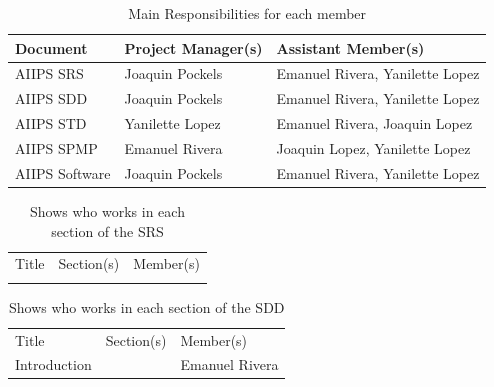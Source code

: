 \documentclass[12pt]{article}
\begin{document}
\begin{table}[H]\centering
\begin{tabular}{|>{\centering\arraybackslash}m{5cm}|>{\centering\arraybackslash}m{5cm}|>{\centering\arraybackslash}m{5cm}|}
  \hline
  Document & Project Manager(s) & Assistant Member(s) \\
   \hline
   AIIPS SRS & Joaquin Pockels & Emanuel Rivera, Yanilette Lopez \\
   \hline
   AIIPS SDD & Joaquin Pockels & Emanuel Rivera, Yanilette Lopez\\
   \hline
   AIIPS STD & Yanilette Lopez & Emanuel Rivera, Joaquin Lopez  \\
   \hline
   AIIPS SPMP & Emanuel Rivera & Joaquin Lopez, Yanilette Lopez \\
   \hline
   AIIPS Software & Joaquin Pockels & Emanuel Rivera, Yanilette Lopez \\
   \hline
\end{tabular}
\caption{Main Responsibilities for each member}
\label{RespMem}
\end{table}

\begin{table}[H]\centering
\begin{tabular}{|>{\centering\arraybackslash}m{5cm}|>{\centering\arraybackslash}m{5cm}|>{\centering\arraybackslash}m{5cm}|}
  \hline
  \multicolumn{3}{|c|}{SRS} \\
  \hline
  Title & Section(s) & Member(s) \\
   \hline
    &  &  \\
   \hline
\end{tabular}
\caption{Shows who works in each section of the SRS}
\label{RespSRS}
\end{table}

\begin{table}[H]\centering
\begin{tabular}{|>{\centering\arraybackslash}m{5cm}|>{\centering\arraybackslash}m{5cm}|>{\centering\arraybackslash}m{5cm}|}
  \hline
  \multicolumn{3}{|c|}{SDD} \\
  \hline
  Title & Section(s) & Member(s) \\
   \hline
    Introduction & 1 & Emanuel Rivera \\
   \hline
\end{tabular}
\caption{Shows who works in each section of the SDD}
\label{RespSDD}
\end{table}
\end{document}
